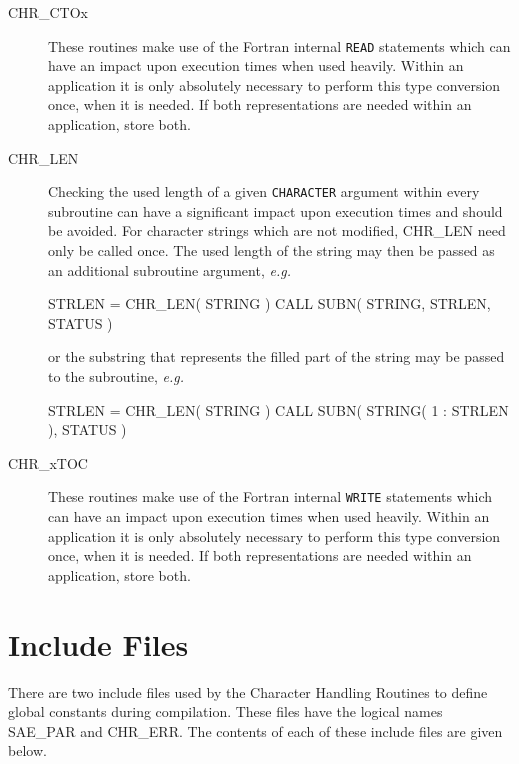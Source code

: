 \documentclass[twoside,11pt,nolof]{starlink}
\begin{document}
\begin {description}
\item [CHR\_CTOx] These routines make use of the Fortran internal \texttt{READ}
statements which can have an impact upon execution times when used heavily.
Within an application it is only absolutely necessary to perform this type
conversion once, when it is needed.
If both representations are needed within an application, store both.
\item [CHR\_LEN] Checking the used length of a given \texttt{CHARACTER}
argument within every subroutine can have a significant impact upon execution
times and should be avoided.
For character strings which are not modified, CHR\_LEN need only be called
once.
The used length of the string may then be passed as an additional subroutine
argument, \emph{e.g.}
\begin {small}
\begin{terminalv}
      STRLEN = CHR_LEN( STRING )
      CALL SUBN( STRING, STRLEN, STATUS )
\end{terminalv}
\end {small}
or the substring that represents the filled part of the string may be passed
to the subroutine, \emph{e.g.}
\begin {small}
\begin{terminalv}
      STRLEN = CHR_LEN( STRING )
      CALL SUBN( STRING( 1 : STRLEN ), STATUS )
\end{terminalv}
\end {small}
\item [CHR\_xTOC] These routines make use of the Fortran internal \texttt{WRITE}
statements which can have an impact upon execution times when used heavily.
Within an application it is only absolutely necessary to perform this type
conversion once, when it is needed.
If both representations are needed within an application, store both.
\end {description}


\appendix
\section {Include Files \label{incl_sect}}
There are two include files used by the Character Handling Routines
to define global constants during compilation.
These files have the logical names SAE\_PAR and CHR\_ERR.
The contents of each of these include files are given below.
\end{document}

